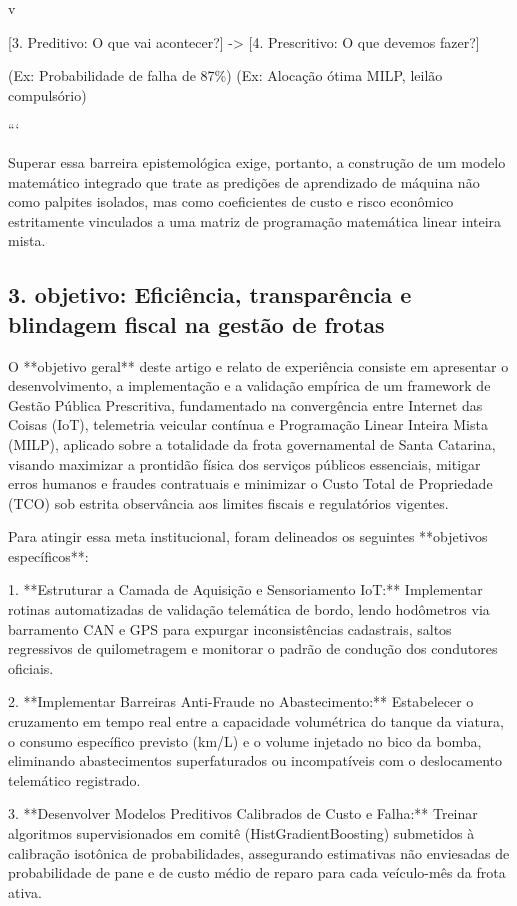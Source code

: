 \documentclass[12pt,a4paper]{article}
\begin{document}
v

[3. Preditivo: O que vai acontecer?] -> [4. Prescritivo: O que devemos fazer?]

(Ex: Probabilidade de falha de 87\%)     (Ex: Alocação ótima MILP, leilão compulsório)

```

Superar essa barreira epistemológica exige, portanto, a construção de um modelo matemático integrado que trate as predições de aprendizado de máquina não como palpites isolados, mas como coeficientes de custo e risco econômico estritamente vinculados a uma matriz de programação matemática linear inteira mista.


\subsection{3. objetivo: Eficiência, transparência e blindagem fiscal na gestão de frotas}

O **objetivo geral** deste artigo e relato de experiência consiste em apresentar o desenvolvimento, a implementação e a validação empírica de um framework de Gestão Pública Prescritiva, fundamentado na convergência entre Internet das Coisas (IoT), telemetria veicular contínua e Programação Linear Inteira Mista (MILP), aplicado sobre a totalidade da frota governamental de Santa Catarina, visando maximizar a prontidão física dos serviços públicos essenciais, mitigar erros humanos e fraudes contratuais e minimizar o Custo Total de Propriedade (TCO) sob estrita observância aos limites fiscais e regulatórios vigentes.

Para atingir essa meta institucional, foram delineados os seguintes **objetivos específicos**:

1. **Estruturar a Camada de Aquisição e Sensoriamento IoT:** Implementar rotinas automatizadas de validação telemática de bordo, lendo hodômetros via barramento CAN e GPS para expurgar inconsistências cadastrais, saltos regressivos de quilometragem e monitorar o padrão de condução dos condutores oficiais.

2. **Implementar Barreiras Anti-Fraude no Abastecimento:** Estabelecer o cruzamento em tempo real entre a capacidade volumétrica do tanque da viatura, o consumo específico previsto (km/L) e o volume injetado no bico da bomba, eliminando abastecimentos superfaturados ou incompatíveis com o deslocamento telemático registrado.

3. **Desenvolver Modelos Preditivos Calibrados de Custo e Falha:** Treinar algoritmos supervisionados em comitê (HistGradientBoosting) submetidos à calibração isotônica de probabilidades, assegurando estimativas não enviesadas de probabilidade de pane e de custo médio de reparo para cada veículo-mês da frota ativa.
\end{document}
